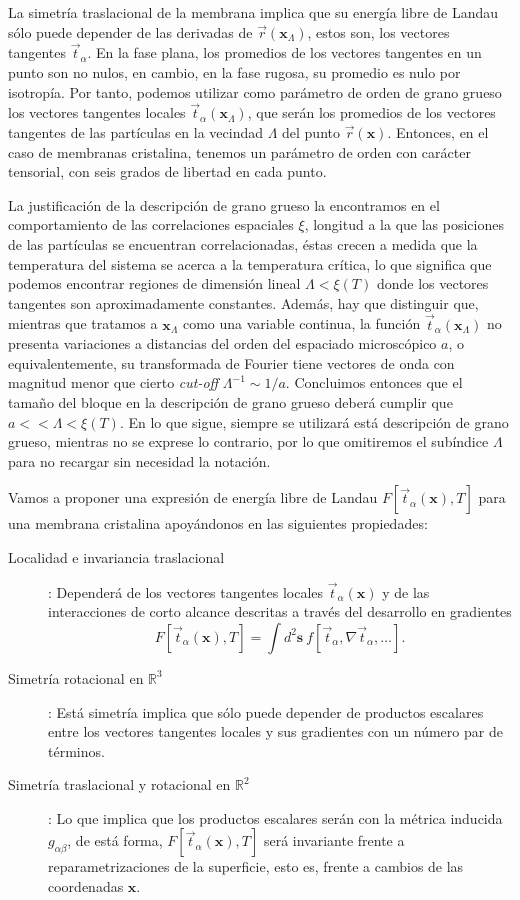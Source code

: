 La simetría traslacional de la membrana implica que su energía libre de Landau
sólo puede depender de las derivadas de $\vec{r}(\mathbf{x}_{\Lambda})$, estos
son, los vectores tangentes $\vec{t}_{\alpha}$. En la fase
plana, los promedios de los vectores tangentes en un punto son no nulos, en
cambio, en la fase rugosa, su promedio es nulo por isotropía. Por tanto,
podemos utilizar como  parámetro de orden de grano grueso los vectores
tangentes locales $\vec{t}_{\alpha}(\mathbf{x}_{\Lambda})$, que serán
los promedios de los vectores tangentes de las partículas en la vecindad
$\Lambda$ del punto $\vec{r}(\mathbf{x})$. Entonces, en el caso de
membranas cristalina, tenemos un parámetro de orden con carácter tensorial,
con seis grados de libertad en cada punto.

La justificación de la descripción de grano grueso la encontramos en el
comportamiento de las correlaciones espaciales $\xi$, longitud a la que las
posiciones de las partículas se encuentran correlacionadas, éstas crecen a
medida que la temperatura del sistema se acerca a la temperatura crítica, lo
que significa que podemos encontrar regiones de dimensión lineal
$\Lambda<\xi(T)$ donde los vectores tangentes son aproximadamente
constantes. Además, hay que distinguir que, mientras que tratamos a
$\mathbf{x}_{\Lambda}$ como una variable continua, la función 
$\vec{t}_{\alpha}(\mathbf{x}_{\Lambda})$ no presenta variaciones a distancias
del orden del espaciado microscópico $a$, o equivalentemente, su transformada
de Fourier tiene vectores de onda con magnitud menor que cierto \textit{cut-off}
$\Lambda^{-1} \sim 1/a$. Concluimos entonces que el tamaño del bloque en la
descripción de grano grueso deberá cumplir que $a<<\Lambda<\xi(T)$. En lo que
sigue, siempre se utilizará está descripción de grano grueso, mientras no se
exprese lo contrario, por lo que omitiremos el subíndice $\Lambda$ para no
recargar sin necesidad la notación. 

Vamos a proponer una expresión de energía libre de Landau
$F[\vec{t}_{\alpha}(\mathbf{x}),T]$ para una membrana cristalina
apoyándonos en las siguientes propiedades:
\begin{description}
\item[Localidad e invariancia traslacional]: Dependerá de los vectores
  tangentes locales $\vec{t}_{\alpha}(\mathbf{x})$ y de las
  interacciones de corto alcance descritas a través del desarrollo en gradientes
  $$ F[\vec{t}_{\alpha}(\mathbf{x}),T]=\int\! d^2\mathbf{s}\ f[\vec{t}_{\alpha},\nabla
  \vec{t}_{\alpha},\dots].$$ 
\item[Simetría rotacional en $\mathbb{R}^3$]: Está simetría implica que sólo
  puede depender de productos escalares entre los vectores tangentes
  locales y sus gradientes con un número par de términos. 

\item[Simetría traslacional y rotacional en $\mathbb{R}^2$]: Lo que implica
  que los productos escalares serán con la métrica inducida $g_{\alpha\beta}$,
  de está forma, $F[\vec{t}_{\alpha}(\mathbf{x}),T]$ será invariante frente a
  reparametrizaciones de la superficie, esto es, frente a cambios de 
  las coordenadas $\mathbf{x}$.
\end{description}

